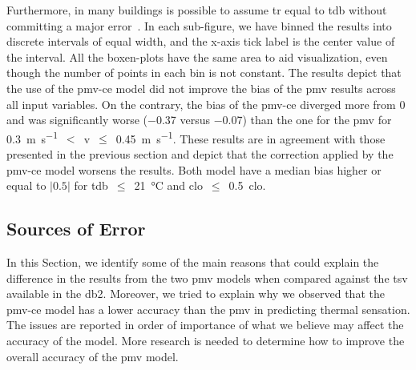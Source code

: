 Furthermore, in many buildings is possible to assume \ac{tr} equal to \ac{tdb} without committing a major error~\cite{Dawe2020}.
In each sub-figure, we have binned the results into discrete intervals of equal width, and the x-axis tick label is the center value of the interval.
All the boxen-plots have the same area to aid visualization, even though the number of points in each bin is not constant.
The results depict that the use of the \ac{pmv-ce} model did not improve the bias of the \ac{pmv} results across all input variables.
On the contrary, the bias of the \ac{pmv-ce} diverged more from 0 and was significantly worse (\num{-.37} versus \num{-0.07}) than the one for the \ac{pmv} for \qty{0.3}{\m\per\s}~$<$~\ac{v}~$\leq$~\qty{0.45}{\m\per\s}.
These results are in agreement with those presented in the previous section and depict that the correction applied by the \ac{pmv-ce} model worsens the results.
Both model have a median bias higher or equal to $\lvert0.5\lvert$ for \ac{tdb}~$\leq$~\qty{21}{\celsius} and \ac{clo}~$\leq$~\qty{.5}{clo}.

\subsection{Sources of Error}\label{subsec:sources-of-error}
In this Section, we identify some of the main reasons that could explain the difference in the results from the two \ac{pmv} models when compared against the \ac{tsv} available in the \ac{db2}.
Moreover, we tried to explain why we observed that the \ac{pmv-ce} model has a lower accuracy than the \ac{pmv} in predicting thermal sensation.
The issues are reported in order of importance of what we believe may affect the accuracy of the model.
More research is needed to determine how to improve the overall accuracy of the \ac{pmv} model.

